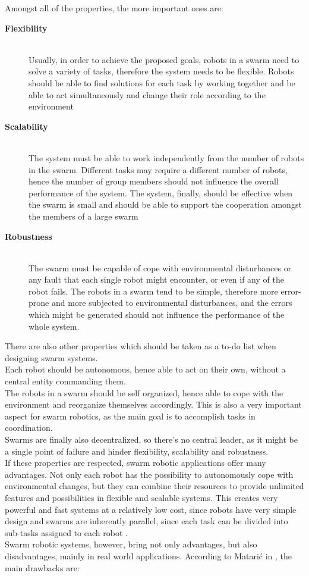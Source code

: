 \documentclass[conference]{IEEEtran}
\begin{document}
Amongst all of the properties, the more important ones are:
\begin{description}
  \item[\textbf{Flexibility}] \hfill\\ Usually, in order to achieve the proposed goals, robots in a swarm need to solve a variety of tasks, therefore the system needs to be flexible. Robots should be able to find solutions for each task by working together and be able to act simultaneously and change their role according to the environment
  \item[\textbf{Scalability}] \hfill \\ The system must be able to work independently from the number of robots in the swarm. Different tasks may require a different number of robots, hence the number of group members should not influence the overall performance of the system. The system, finally, should be effective when the swarm is small and should be able to support the cooperation amongst the members of a large swarm
  \item[\textbf{Robustness}] \hfill \\ The swarm must be capable of cope with environmental disturbances or any fault that each single robot might encounter, or even if any of the robot fails. The robots in a swarm tend to be simple, therefore more error-prone and more subjected to environmental disturbances, and the errors which might be generated should not influence the performance of the whole system. 
\end{description}
There are also other properties which should be taken as a to-do list when designing swarm systems\cite{cheraghi_past_2021}.\\
Each robot should be autonomous, hence able to act on their own, without a central entity commanding them. \\
The robots in a swarm should be self organized, hence able to cope with the environment and reorganize themselves accordingly. This is also a very important aspect for swarm robotics, as the main goal is to accomplish tasks in coordination\cite{cheraghi_past_2021}. \\
Swarms are finally also decentralized, so there's no central leader, as it might be a single point of failure and hinder flexibility, scalability and robustness.\\
If these properties are respected, swarm robotic applications offer many advantages. Not only each robot has the possibility to autonomously cope with environmental changes, but they can combine their resources to provide unlimited features and possibilities in flexible and scalable systems. This creates very powerful and fast systems  at a relatively low cost, since robots have very simple design and swarms are inherently parallel, since each task can be divided into sub-tasks assigned to each robot \cite{cheraghi_past_2021}. \\Swarm robotic systems, however, bring not only advantages, but also disadvantages, mainly in real world applications. According to Matarić in \cite{MATARIC1995321}, the main drawbacks are:
\end{document}
